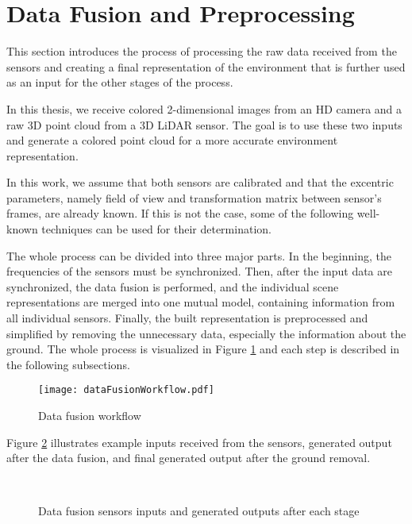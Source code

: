 \section{Data Fusion and Preprocessing}\label{section:fusion}

This section introduces the process of processing the raw data received from the sensors and creating a final representation of the environment that is further used as an input for the other stages of the process.\par
In this thesis, we receive colored 2-dimensional images from an HD camera and a raw 3D point cloud from a 3D LiDAR sensor. The goal is to use these two inputs and generate a colored point cloud for a more accurate environment representation.\par
In this work, we assume that both sensors are calibrated and that the excentric parameters, namely field of view and transformation matrix between sensor's frames, are already known. If this is not the case, some of the following well-known techniques \cite{Calibration1} \cite{Calibration2} can be used for their determination.\par
The whole process can be divided into three major parts. In the beginning, the frequencies of the sensors must be synchronized. Then, after the input data are synchronized, the data fusion is performed, and the individual scene representations are merged into one mutual model, containing information from all individual sensors. Finally, the built representation is preprocessed and simplified by removing the unnecessary data, especially the information about the ground. The whole process is visualized in Figure \ref{fig:dataFusionWorkflow} and each step is described in the following subsections.

\begin{figure}[htpb]
    \centering
    \texttt{[image: dataFusionWorkflow.pdf]}
    \caption{Data fusion workflow} \label{fig:dataFusionWorkflow}
\end{figure}

Figure \ref{fig:dataFusionExample} illustrates example inputs received from the sensors, generated output after the data fusion, and final generated output after the ground removal.

\begin{figure}[!tbp]
    \centering
    \hfill
    \\
    \hfill
    \caption{Data fusion sensors inputs and generated outputs after each stage}
    \label{fig:dataFusionExample}
\end{figure}

